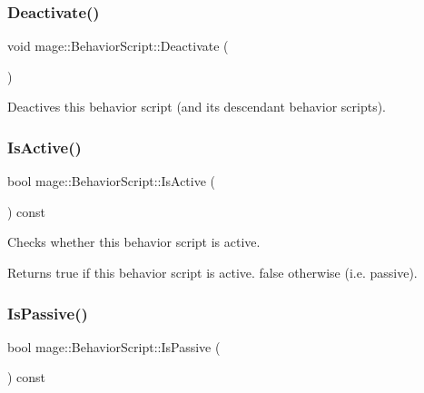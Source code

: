 \subsubsection{\texorpdfstring{Deactivate()}{Deactivate()}}
{\footnotesize\ttfamily void mage\+::\+Behavior\+Script\+::\+Deactivate (\begin{DoxyParamCaption}{ }\end{DoxyParamCaption})\hspace{0.3cm}{\ttfamily [noexcept]}}

Deactives this behavior script (and its descendant behavior scripts). \hypertarget{classmage_1_1_behavior_script_a856e1b420ea0ead36adafa750237325c}{}\label{classmage_1_1_behavior_script_a856e1b420ea0ead36adafa750237325c} 
\subsubsection{\texorpdfstring{Is\+Active()}{IsActive()}}
{\footnotesize\ttfamily bool mage\+::\+Behavior\+Script\+::\+Is\+Active (\begin{DoxyParamCaption}{ }\end{DoxyParamCaption}) const\hspace{0.3cm}{\ttfamily [noexcept]}}

Checks whether this behavior script is active.

\begin{DoxyReturn}{Returns}
{\ttfamily true} if this behavior script is active. {\ttfamily false} otherwise (i.\+e. passive). 
\end{DoxyReturn}
\hypertarget{classmage_1_1_behavior_script_a40e33539ca7013a13ef127af11bff3e1}{}\label{classmage_1_1_behavior_script_a40e33539ca7013a13ef127af11bff3e1} 
\subsubsection{\texorpdfstring{Is\+Passive()}{IsPassive()}}
{\footnotesize\ttfamily bool mage\+::\+Behavior\+Script\+::\+Is\+Passive (\begin{DoxyParamCaption}{ }\end{DoxyParamCaption}) const\hspace{0.3cm}{\ttfamily [noexcept]}}

